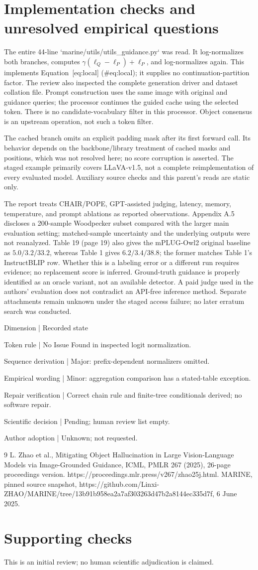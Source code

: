 \documentclass[10pt]{article}
\begin{document}
\section*{Implementation checks and unresolved empirical questions}
The entire 44-line `marine/utils/utils\_guidance.py` was read. It log-normalizes both branches, computes \(\gamma(\ell_Q-\ell_P)+\ell_P\), and log-normalizes again. This implements Equation [eq:local] (\#eq:local); it supplies no continuation-partition factor. The review also inspected the complete generation driver and dataset collation file. Prompt construction uses the same image with original and guidance queries; the processor continues the guided cache using the selected token. There is no candidate-vocabulary filter in this processor. Object consensus is an upstream operation, not such a token filter.\par
The cached branch omits an explicit padding mask after its first forward call. Its behavior depends on the backbone/library treatment of cached masks and positions, which was not resolved here; no score corruption is asserted. The staged example primarily covers LLaVA-v1.5, not a complete reimplementation of every evaluated model. Auxiliary source checks and this parent’s reads are static only.\par
The report treats CHAIR/POPE, GPT-assisted judging, latency, memory, temperature, and prompt ablations as reported observations. Appendix A.5 discloses a 200-sample Woodpecker subset compared with the larger main evaluation setting; matched-sample uncertainty and the underlying outputs were not reanalyzed. Table 19 (page 19) also gives the mPLUG-Owl2 original baseline as \(5.0/3.2/33.2\), whereas Table 1 gives \(6.2/3.4/38.8\); the former matches Table 1’s InstructBLIP row. Whether this is a labeling error or a different run requires evidence; no replacement score is inferred. Ground-truth guidance is properly identified as an oracle variant, not an available detector. A paid judge used in the authors’ evaluation does not contradict an API-free inference method. Separate attachments remain unknown under the staged access failure; no later erratum search was conducted.\par
Dimension | Recorded state\par
Token rule | No Issue Found in inspected logit normalization.\par
Sequence derivation | Major: prefix-dependent normalizers omitted.\par
Empirical wording | Minor: aggregation comparison has a stated-table exception.\par
Repair verification | Correct chain rule and finite-tree conditionals derived; no software repair.\par
Scientific decision | Pending; human review list empty.\par
Author adoption | Unknown; not requested.\par
9 L. Zhao et al., Mitigating Object Hallucination in Large Vision-Language Models via Image-Grounded Guidance, ICML, PMLR 267 (2025), 26-page proceedings version. https://proceedings.mlr.press/v267/zhao25j.html. MARINE, pinned source snapshot, https://github.com/Linxi-ZHAO/MARINE/tree/13b91b958ea2a7af303263d47b2a8144ec335d7f, 6 June 2025.\par
\section*{Supporting checks}
This is an initial review; no human scientific adjudication is claimed.\par
\end{document}
